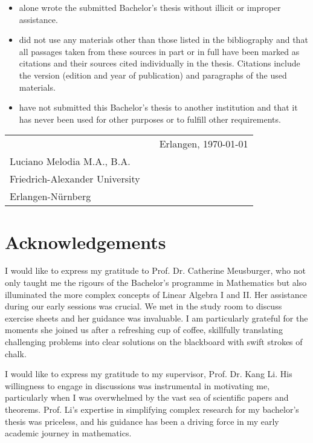 \documentclass[b5paper, 11pt, twoside]{report}
\numberwithin{conj}{section}
\begin{document}
\begin{itemize}
	\item alone wrote the submitted Bachelor's thesis without illicit or improper
	      assistance.
	      	      
	\item did not use any materials other than those listed in the bibliography and
	      that all passages taken from these sources in part or in full have been marked
	      as citations and their sources cited individually in the thesis. Citations
	      include the version (edition and year of publication) and paragraphs of the used materials.
	      	      
	\item have not submitted this Bachelor's thesis to another institution and that
	      it has never been used for other purposes or to fulfill other requirements.
\end{itemize}

\vspace{2cm}
\begin{tabular}{@{}p{3.5in}p{2in}p{2in}@{}}
	\hrulefill                 &   & Erlangen, \today \\
	Luciano Melodia M.A., B.A. &   &                  \\
	Friedrich-Alexander University \\
	Erlangen-Nürnberg
\end{tabular}

\chapter*{Acknowledgements}
I would like to express my gratitude to Prof. Dr. Catherine Meusburger, who not only taught me the rigours of the Bachelor's programme in Mathematics but also illuminated the more complex concepts of Linear Algebra I and II. Her assistance during our early sessions was crucial. We met in the study room to discuss exercise sheets and her guidance was invaluable. I am particularly grateful for the moments she joined us after a refreshing cup of coffee, skillfully translating challenging problems into clear solutions on the blackboard with swift strokes of chalk.

I would like to express my gratitude to my supervisor, Prof. Dr. Kang Li. His willingness to engage in discussions was instrumental in motivating me, particularly when I was overwhelmed by the vast sea of scientific papers and theorems. Prof. Li's expertise in simplifying complex research for my bachelor's thesis was priceless, and his guidance has been a driving force in my early academic journey in mathematics.
\end{document}
